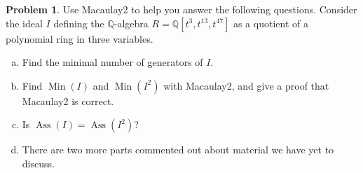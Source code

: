 \documentclass[11pt]{article}
\DeclareMathOperator{\Ass}{Ass}
\DeclareMathOperator{\Min}{Min}
\theoremstyle{definition}
\newtheorem{problem}{Problem}
\begin{document}
\begin{problem}
	Use Macaulay2 to help you answer the following questions. Consider the ideal $I$ defining the $\mathbb{Q}$-algebra $R=\mathbb{Q}[t^3,t^{13},t^{47}]$ as a quotient of a polynomial ring in three variables.
	\begin{enumerate}[(a)]
		\item Find the minimal number of generators of $I$.
		\item Find $\Min(I)$ and $\Min(I^2)$ with Macaulay2, and give a proof that Macaulay2 is correct.
		\item Is $\Ass(I) = \Ass(I^2)$?
		\item There are two more parts commented out about material we have yet to discuss.
	\end{enumerate}
\end{problem}
\end{document}
